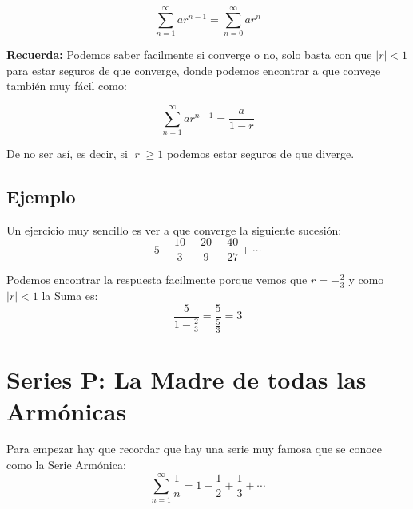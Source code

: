 \documentclass[12pt]{report}							    %
\begin{document}
        \begin{equation}
            \sum_{n=1}^{\infty} ar^{n-1} = \sum_{n=0}^{\infty} ar^n 
        \end{equation}

        \textbf{Recuerda:}
        Podemos saber facilmente si converge o no, solo basta con que $|r| < 1$ 
        para estar seguros de que converge, donde podemos encontrar a que convege
        también muy fácil como:

        \begin{equation}
            \sum_{n=1}^{\infty} ar^{n-1} = \frac{a}{1-r}
        \end{equation}

        De no ser así, es decir, si $|r| \geq 1$ podemos estar seguros de que diverge.


        \subsection{Ejemplo}
        Un ejercicio muy sencillo es ver a que converge la siguiente sucesión:
        \begin{equation*}
            5 - \frac{10}{3} + \frac{20}{9} - \frac{40}{27} + \cdots
        \end{equation*}

        Podemos encontrar la respuesta facilmente porque vemos que
        $r=-\frac{2}{3}$ y como $|r|<1$ la Suma es:
        \begin{equation*}
            \frac{5}{1-\frac{2}{3}} = \frac{5}{\frac{5}{3}} = 3
        \end{equation*}



    \clearpage
    \section{Series P: La Madre de todas las Armónicas}
        Para empezar hay que recordar que hay una serie muy famosa que se conoce como
        la Serie Armónica:
        \begin{equation}
            \sum_{n=1}^{\infty} \frac{1}{n} = 1 + \frac{1}{2}  + \frac{1}{3} + \cdots
        \end{equation}
\end{document}
